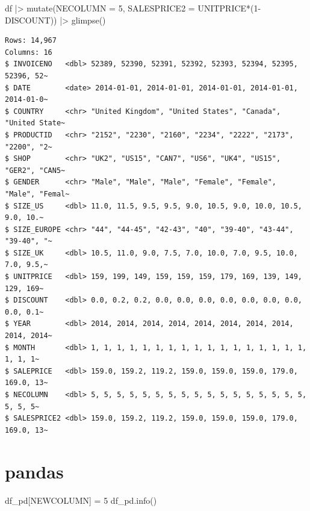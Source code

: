 \documentclass[
  letterpaper,
  DIV=11,
  numbers=noendperiod]{scrreprt}
\newenvironment{Shaded}{\begin{snugshade}}{\end{snugshade}}
\newcommand{\AttributeTok}[1]{\textcolor[rgb]{0.40,0.45,0.13}{#1}}
\newcommand{\DecValTok}[1]{\textcolor[rgb]{0.68,0.00,0.00}{#1}}
\newcommand{\FunctionTok}[1]{\textcolor[rgb]{0.28,0.35,0.67}{#1}}
\newcommand{\NormalTok}[1]{\textcolor[rgb]{0.00,0.23,0.31}{#1}}
\newcommand{\OperatorTok}[1]{\textcolor[rgb]{0.37,0.37,0.37}{#1}}
\newcommand{\SpecialCharTok}[1]{\textcolor[rgb]{0.37,0.37,0.37}{#1}}
\newcommand{\StringTok}[1]{\textcolor[rgb]{0.13,0.47,0.30}{#1}}
\begin{document}
\begin{Shaded}
\begin{Highlighting}[]
\NormalTok{df }\SpecialCharTok{|\textgreater{}}
    \FunctionTok{mutate}\NormalTok{(}\AttributeTok{NECOLUMN =} \DecValTok{5}\NormalTok{,}
    \AttributeTok{SALESPRICE2 =}\NormalTok{ UNITPRICE}\SpecialCharTok{*}\NormalTok{(}\DecValTok{1}\SpecialCharTok{{-}}\NormalTok{DISCOUNT)) }\SpecialCharTok{|\textgreater{}}
    \FunctionTok{glimpse}\NormalTok{()}
\end{Highlighting}
\end{Shaded}

\begin{verbatim}
Rows: 14,967
Columns: 16
$ INVOICENO   <dbl> 52389, 52390, 52391, 52392, 52393, 52394, 52395, 52396, 52~
$ DATE        <date> 2014-01-01, 2014-01-01, 2014-01-01, 2014-01-01, 2014-01-0~
$ COUNTRY     <chr> "United Kingdom", "United States", "Canada", "United State~
$ PRODUCTID   <chr> "2152", "2230", "2160", "2234", "2222", "2173", "2200", "2~
$ SHOP        <chr> "UK2", "US15", "CAN7", "US6", "UK4", "US15", "GER2", "CAN5~
$ GENDER      <chr> "Male", "Male", "Male", "Female", "Female", "Male", "Femal~
$ SIZE_US     <dbl> 11.0, 11.5, 9.5, 9.5, 9.0, 10.5, 9.0, 10.0, 10.5, 9.0, 10.~
$ SIZE_EUROPE <chr> "44", "44-45", "42-43", "40", "39-40", "43-44", "39-40", "~
$ SIZE_UK     <dbl> 10.5, 11.0, 9.0, 7.5, 7.0, 10.0, 7.0, 9.5, 10.0, 7.0, 9.5,~
$ UNITPRICE   <dbl> 159, 199, 149, 159, 159, 159, 179, 169, 139, 149, 129, 169~
$ DISCOUNT    <dbl> 0.0, 0.2, 0.2, 0.0, 0.0, 0.0, 0.0, 0.0, 0.0, 0.0, 0.0, 0.1~
$ YEAR        <dbl> 2014, 2014, 2014, 2014, 2014, 2014, 2014, 2014, 2014, 2014~
$ MONTH       <dbl> 1, 1, 1, 1, 1, 1, 1, 1, 1, 1, 1, 1, 1, 1, 1, 1, 1, 1, 1, 1~
$ SALEPRICE   <dbl> 159.0, 159.2, 119.2, 159.0, 159.0, 159.0, 179.0, 169.0, 13~
$ NECOLUMN    <dbl> 5, 5, 5, 5, 5, 5, 5, 5, 5, 5, 5, 5, 5, 5, 5, 5, 5, 5, 5, 5~
$ SALESPRICE2 <dbl> 159.0, 159.2, 119.2, 159.0, 159.0, 159.0, 179.0, 169.0, 13~
\end{verbatim}

\section{pandas}

\begin{Shaded}
\begin{Highlighting}[]
\NormalTok{df\_pd[}\StringTok{\textquotesingle{}NEWCOLUMN\textquotesingle{}}\NormalTok{] }\OperatorTok{=} \DecValTok{5}
\NormalTok{df\_pd.info()     }
\end{Highlighting}
\end{Shaded}
\end{document}
